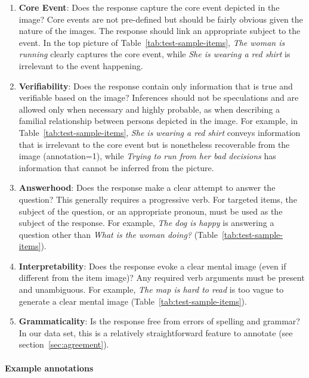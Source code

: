 \documentclass[11pt,a4paper]{article}
\newcommand{\lk}[1]{\marginpar{\scriptsize LK: #1}}
\renewcommand{\marginpar}[1]{}
\begin{document}
\begin{enumerate}
\item \textbf{Core Event}: Does the response capture the core event depicted in the image? Core events are not pre-defined but should be fairly obvious given the nature of the images. The response should link an appropriate subject to the event.  In the top picture of Table~\ref{tab:test-sample-items}, \textit{The woman is running} clearly captures the core event, while \textit{She is wearing a red shirt} is irrelevant to the event happening.
\item \textbf{Verifiability}: Does the response contain only information that is true and verifiable based on the image? Inferences should not be speculations and are allowed only when necessary and highly probable, as when describing a familial relationship between persons depicted in the image.  For example, in Table~\ref{tab:test-sample-items}, \textit{She is wearing a red shirt} conveys information that is irrelevant to the core event but is nonetheless recoverable from the image (annotation=1), while \textit{Trying to run from her bad decisions} has information that cannot be inferred from the picture.
\item \textbf{Answerhood}: Does the response make a clear attempt to answer the question? This generally requires a progressive verb. For targeted items, the subject of the question, or an appropriate pronoun, must be used as the subject of the response.  For example, \textit{The dog is happy} is answering a question other than \textit{What is the woman doing?} (Table~\ref{tab:test-sample-items}).
\item \textbf{Interpretability}: Does the response evoke a clear mental image (even if different from the item image)? Any required verb arguments must be present and unambiguous.  For example, \textit{The map is hard to read} is too vague to generate a clear mental image (Table~\ref{tab:test-sample-items}).
\item \textbf{Grammaticality}: Is the response free from errors of spelling and grammar?  
In our data set, this is a relatively straightforward feature to annotate (see section~\ref{sec:agreement}).

\end{enumerate}

\paragraph{Example annotations}
\end{document}
